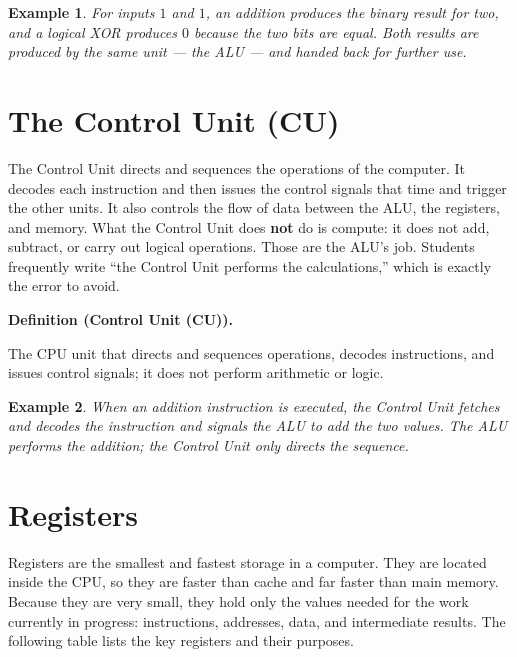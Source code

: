 \documentclass[11pt]{article}
\newtheorem{example}{Example}[section]
\newenvironment{definitionbox}[1]{%
  \par\noindent\textbf{Definition (#1).}\ \itshape
}{\par\vspace{0.3em}}
\begin{document}
\begin{example}
For inputs $1$ and $1$, an addition produces the binary result for two, and
a logical XOR produces $0$ because the two bits are equal. Both results are
produced by the same unit --- the ALU --- and handed back for further use.
\end{example}

\section{The Control Unit (CU)}
The Control Unit directs and sequences the operations of the computer. It
decodes each instruction and then issues the control signals that time and
trigger the other units. It also controls the flow of data between the ALU,
the registers, and memory. What the Control Unit does \textbf{not} do is
compute: it does not add, subtract, or carry out logical operations. Those
are the ALU's job. Students frequently write ``the Control Unit performs the
calculations,'' which is exactly the error to avoid.

\begin{definitionbox}{Control Unit (CU)}
The CPU unit that directs and sequences operations, decodes instructions,
and issues control signals; it does not perform arithmetic or logic.
\end{definitionbox}

\begin{example}
When an addition instruction is executed, the Control Unit fetches and
decodes the instruction and signals the ALU to add the two values. The ALU
performs the addition; the Control Unit only directs the sequence.
\end{example}

\section{Registers}
Registers are the smallest and fastest storage in a computer. They are
located inside the CPU, so they are faster than cache and far faster than
main memory. Because they are very small, they hold only the values needed
for the work currently in progress: instructions, addresses, data, and
intermediate results. The following table lists the key registers and their
purposes.
\end{document}
